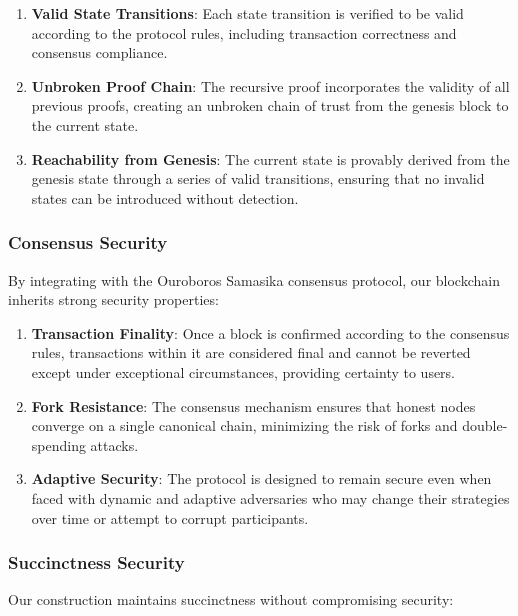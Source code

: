 \documentclass{article}
\theoremstyle{plain}
\theoremstyle{definition}
\theoremstyle{remark}
\theoremstyle{problem}
\begin{document}
\begin{enumerate}
    \item \textbf{Valid State Transitions}: Each state transition is verified to be valid according to the protocol rules, including transaction correctness and consensus compliance.

    \item \textbf{Unbroken Proof Chain}: The recursive proof incorporates the validity of all previous proofs, creating an unbroken chain of trust from the genesis block to the current state.

    \item \textbf{Reachability from Genesis}: The current state is provably derived from the genesis state through a series of valid transitions, ensuring that no invalid states can be introduced without detection.
\end{enumerate}

\subsubsection{Consensus Security}

By integrating with the Ouroboros Samasika consensus protocol, our blockchain inherits strong security properties:

\begin{enumerate}
    \item \textbf{Transaction Finality}: Once a block is confirmed according to the consensus rules, transactions within it are considered final and cannot be reverted except under exceptional circumstances, providing certainty to users.

    \item \textbf{Fork Resistance}: The consensus mechanism ensures that honest nodes converge on a single canonical chain, minimizing the risk of forks and double-spending attacks.

    \item \textbf{Adaptive Security}: The protocol is designed to remain secure even when faced with dynamic and adaptive adversaries who may change their strategies over time or attempt to corrupt participants.
\end{enumerate}
\subsubsection{Succinctness Security}

Our construction maintains succinctness without compromising security:
\end{document}
